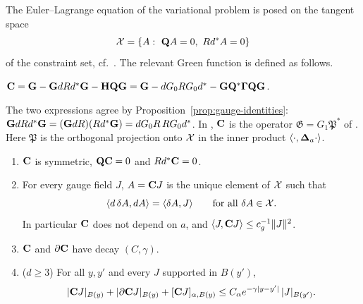 The Euler--Lagrange equation of the variational problem is posed on the tangent space
\[
\cX=\{A:\ \bQ A=0,\ Rd^*A=0\}
\]
of the constraint set, cf.\ \cite[(100)--(111)]{BalVar}. The relevant Green function is defined as follows.

\begin{definition}
$\mathbf C=\mathbf G-\mathbf G dRd^*\mathbf G-\mathbf H\mathbf Q\mathbf G=\mathbf G-dG_0RG_0d^*-\mathbf G\mathbf Q^*\boldsymbol\Gamma\mathbf Q\mathbf G$.
\end{definition}

The two expressions agree by Proposition~\ref{prop:gauge-identities}: $\mathbf G dRd^*\mathbf G=(\mathbf G dR)(Rd^*\mathbf G)=dG_0R\,RG_0d^*$. In \cite{BalBackground,BalVar}, $\mathbf C$ is the operator $\mathfrak G=G_1\mathfrak P^*$ of \cite[(3.148)--(3.153)]{BalBackground}. Here $\mathfrak P$ is the orthogonal projection onto $\mathcal X$ in the inner product $\langle \cdot,\boldsymbol{\Delta}_a\cdot\rangle$.

\begin{theorem}\label{thm:C-gauge}
\begin{enumerate}[label=(\alph*)]
\item $\mathbf C$ is symmetric, $\mathbf Q\mathbf C=0$ and $Rd^*\mathbf C=0$.
\item For every gauge field $J$, $A=\mathbf C J$ is the unique element of $\mathcal X$ such that
\[
\langle d\,\delta A,dA\rangle=\langle \delta A,J\rangle\qquad\text{for all }\delta A\in\mathcal X .
\]
In particular $\mathbf C$ does not depend on $a$, and $\langle J,\mathbf C J\rangle\le c_g^{-1}\|J\|^2$.
\item $\mathbf C$ and $\partial\mathbf C$ have decay $(C,\gamma)$.
\item ($d\ge3$) For all $y,y'$ and every $J$ supported in $B(y')$,
\[
|\mathbf C J|_{B(y)}+|\partial\mathbf C J|_{B(y)}+[\mathbf C J]_{\alpha,B(y)}\le C_\alpha e^{-\gamma|y-y'|}\,|J|_{B(y')} .
\]
\end{enumerate}
\end{theorem}


